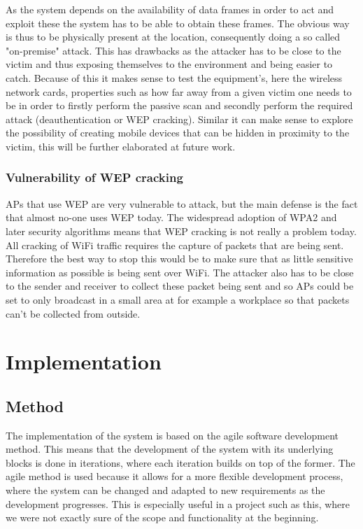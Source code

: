 As the system depends on the availability of data frames in order to act and exploit these the system has to be able to obtain these frames. The obvious way is thus to be physically present at the location, consequently doing a so called "on-premise" attack. This has drawbacks as the attacker has to be close to the victim and thus exposing themselves to the environment and being easier to catch. Because of this it makes sense to test the equipment's, here the wireless network cards, properties such as how far away from a given victim one needs to be in order to firstly perform the passive scan and secondly perform the required attack (deauthentication or WEP cracking). Similar it can make sense to explore the possibility of creating mobile devices that can be hidden in proximity to the victim, this will be further elaborated at future work. 

\subsubsection{Vulnerability of WEP cracking}
APs that use WEP are very vulnerable to attack, but the main defense is the fact that almost no-one uses WEP today. The widespread adoption of WPA2 and later security algorithms means that WEP cracking is not really a problem today. All cracking of WiFi traffic requires the capture of packets that are being sent. Therefore the best way to stop this would be to make sure that as little sensitive information as possible is being sent over WiFi. The attacker also has to be close to the sender and receiver to collect these packet being sent and so APs could be set to only broadcast in a small area at for example a workplace so that packets can't be collected from outside. 

\section{Implementation}

\subsection{Method}
The implementation of the system is based on the agile software development method. This means that the development of the system with its underlying blocks is done in iterations, where each iteration builds on top of the former. 
The agile method is used because it allows for a more flexible development process, where the system can be changed and adapted to new requirements as the development progresses. This is especially useful in a project such as this, where we were not exactly sure of the scope and functionality at the beginning.

